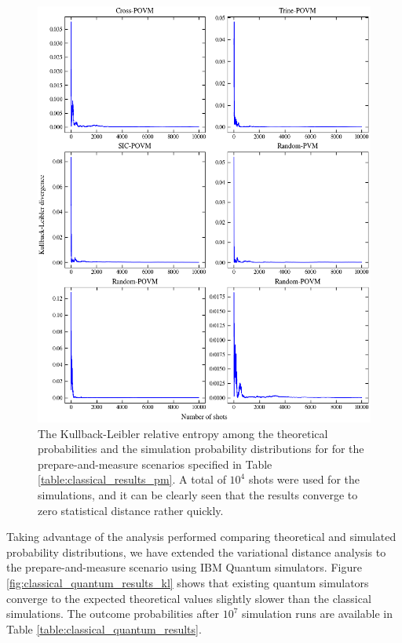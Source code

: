 \begin{figure}[h!]
\centering
\includegraphics[width=\textwidth]{images/pm_povm_kl.png}
\caption{The Kullback-Leibler relative entropy among the theoretical probabilities and the simulation probability distributions for for the prepare-and-measure scenarios specified in Table \ref{table:classical_results_pm}. A total of $10^4$ shots were used for the simulations, and it can be clearly seen that the results converge to zero statistical distance rather quickly.}
\label{fig:classical_results_kl}
\end{figure}

Taking advantage of the analysis performed comparing theoretical and simulated probability distributions, we have extended the variational distance analysis to the prepare-and-measure scenario using IBM Quantum simulators. Figure \ref{fig:classical_quantum_results_kl} shows that existing quantum simulators converge to the expected theoretical values slightly slower than the classical simulations. The outcome probabilities after $10^7$ simulation runs are available in Table \ref{table:classical_quantum_results}.

